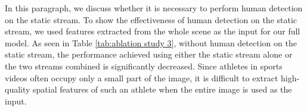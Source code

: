\documentclass[sigconf]{acmart}
\begin{document}
\vspace{5pt}

 In this paragraph, we discuss whether it is necessary to perform human detection on the static stream. To show the effectiveness of human detection on the static stream, we used features extracted from the whole scene as the input for our full model. As seen in Table \ref{tab:ablation study 3}, without human detection on the static stream, the performance achieved using either the static stream alone or the two streams combined is significantly decreased. Since athletes in sports videos often occupy only a small part of the image, it is difficult to extract high-quality spatial features of such an athlete when the entire image is used as the input.



\begin{table}[]
\vspace{0.2cm}
\caption{Ablation study showing the contribution of human detection in our method. 
}
\label{tab:ablation study 3}
\vspace{-1cm}
\end{table}

\vspace{-0.1cm}
\end{document}
